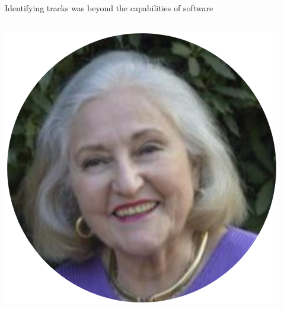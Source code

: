 \documentclass[aspectratio=169]{beamer}
\begin{document}
\begin{frame}{Identifying tracks was beyond the capabilities of software}
\vspace{0.35 cm}
\begin{columns}

\begin{center}
\includegraphics[width=0.5\linewidth]{PLOTS/madeleine-isenberg-SCANNER.png}


\end{center}
\end{columns}
\end{frame}
\end{document}
